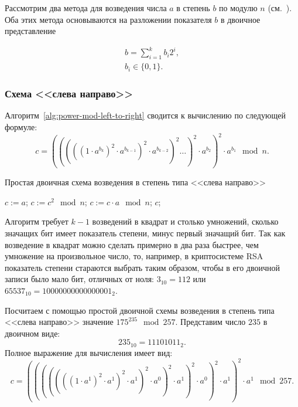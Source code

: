 Рассмотрим два метода для возведения числа $a$ в степень $b$ по модулю $n$ (см.~\cite[9.3.1. Простые двоичные схемы]{Crandall:Pomerance:2011}). Оба этих метода основываются на разложении показателя $b$ в двоичное представление

\begin{equation}
	\begin{array}{l}
		b = \sum\limits_{i=1}^{k} b_i 2^i, \\
		b_i \in \{0, 1\}.
	\end{array}
	\label{eq:power-mod-b}
\end{equation}

\subsubsection{Схема <<слева направо>>}

Алгоритм~\ref{alg:power-mod-left-to-right} сводится к вычислению по следующей формуле:
\[ c = \left( \left( \left( \left( \left( 1 \cdot a^{b_k} \right)^2 \cdot a^{b_{k-1}} \right)^2 \cdot a^{b_{k-2}} \right)^2 \dots \right)^2 \cdot a^{b_2} \right)^2 \cdot a^{b_1} \mod n.\]

\begin{algorithm}[iht]
	\caption{Простая двоичная схема возведения в степень типа <<слева направо>>\label{alg:power-mod-left-to-right}}
	\begin{algorithmic}
		\STATE $c := a$;
			\STATE $c := c^2 \mod n$;
				\STATE $c := c \cdot a \mod n$;
			\ENDIF
		\ENDFOR
		\RETURN $c$;
	\end{algorithmic}
\end{algorithm}

Алгоритм требует $k-1$ возведений в квадрат и столько умножений, сколько значащих бит имеет показатель степени, минус первый значащий бит. Так как возведение в квадрат можно сделать примерно в два раза быстрее, чем умножение на произвольное число, то, например, в криптосистеме RSA показатель степени стараются выбрать таким образом, чтобы в его двоичной записи было мало бит, отличных от ноля: $3_{10} = 11{2}$ или $65537_{10} = 10000000000000001_{2}$.

\example Посчитаем с помощью простой двоичной схемы возведения в степень типа <<слева направо>> значение $175^{235} \mod 257$. Представим число $235$ в двоичном виде:
\[ 235_{10} = 11101011_{2}.\]
Полное выражение для вычисления имеет вид:
\[ c = (((((((1 \cdot a^1)^2 \cdot a^1)^2 \cdot a^1)^2 \cdot a^0)^2 \cdot a^1)^2 \cdot a^0)^2 \cdot a^1)^2 \cdot a^1 \mod 257.\]

